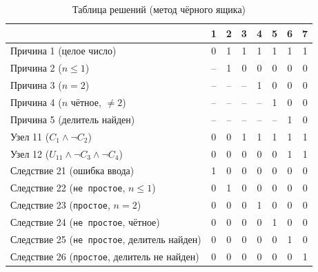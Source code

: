 \documentclass{article}[14pt]
\begin{document}
\begin{table}[H]
\centering
\caption{Таблица решений (метод чёрного ящика)}
\renewcommand{\arraystretch}{1.4}
\begin{tabular}{|l|c|c|c|c|c|c|c|}
\hline
 & \textbf{1} & \textbf{2} & \textbf{3} & \textbf{4} & \textbf{5} & \textbf{6} & \textbf{7} \\
\hline
Причина 1 (целое число)        & 0 & 1 & 1 & 1 & 1 & 1 & 1 \\
\hline
Причина 2 ($n \leq 1$)         & -- & 1 & 0 & 0 & 0 & 0 & 0 \\
\hline
Причина 3 ($n = 2$)            & -- & -- & -- & 1 & 0 & 0 & 0 \\
\hline
Причина 4 ($n$ чётное, $\neq2$) & -- & -- & -- & -- & 1 & 0 & 0 \\
\hline
Причина 5 (делитель найден)    & -- & -- & -- & -- & -- & 1 & 0 \\
\hline
Узел 11 ($C_1 \wedge \neg C_2$)             & 0 & 0 & 1 & 1 & 1 & 1 & 1 \\
\hline
Узел 12 ($U_{11} \wedge \neg C_3 \wedge \neg C_4$) & 0 & 0 & 0 & 0 & 0 & 1 & 1 \\
\hline
Следствие 21 (ошибка ввода)    & 1 & 0 & 0 & 0 & 0 & 0 & 0 \\
\hline
Следствие 22 (\texttt{не простое}, $n\leq1$) & 0 & 1 & 0 & 0 & 0 & 0 & 0 \\
\hline
Следствие 23 (\texttt{простое}, $n=2$)      & 0 & 0 & 0 & 1 & 0 & 0 & 0 \\
\hline
Следствие 24 (\texttt{не простое}, чётное)  & 0 & 0 & 0 & 0 & 1 & 0 & 0 \\
\hline
Следствие 25 (\texttt{не простое}, делитель найден) & 0 & 0 & 0 & 0 & 0 & 1 & 0 \\
\hline
Следствие 26 (\texttt{простое}, делитель не найден) & 0 & 0 & 0 & 0 & 0 & 0 & 1 \\
\hline
\end{tabular}
\end{table}
\end{document}
